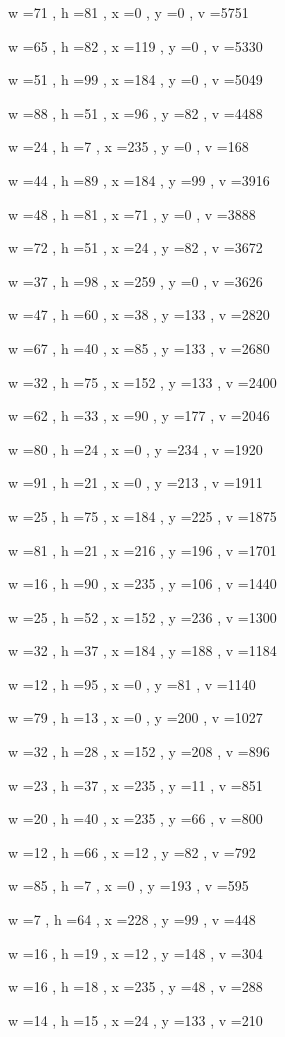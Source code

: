 \documentclass[11pt]{article}
\begin{document}
w =71 , h =81 , x =0 , y =0 , v =5751
\par
w =65 , h =82 , x =119 , y =0 , v =5330
\par
w =51 , h =99 , x =184 , y =0 , v =5049
\par
w =88 , h =51 , x =96 , y =82 , v =4488
\par
w =24 , h =7 , x =235 , y =0 , v =168
\par
w =44 , h =89 , x =184 , y =99 , v =3916
\par
w =48 , h =81 , x =71 , y =0 , v =3888
\par
w =72 , h =51 , x =24 , y =82 , v =3672
\par
w =37 , h =98 , x =259 , y =0 , v =3626
\par
w =47 , h =60 , x =38 , y =133 , v =2820
\par
w =67 , h =40 , x =85 , y =133 , v =2680
\par
w =32 , h =75 , x =152 , y =133 , v =2400
\par
w =62 , h =33 , x =90 , y =177 , v =2046
\par
w =80 , h =24 , x =0 , y =234 , v =1920
\par
w =91 , h =21 , x =0 , y =213 , v =1911
\par
w =25 , h =75 , x =184 , y =225 , v =1875
\par
w =81 , h =21 , x =216 , y =196 , v =1701
\par
w =16 , h =90 , x =235 , y =106 , v =1440
\par
w =25 , h =52 , x =152 , y =236 , v =1300
\par
w =32 , h =37 , x =184 , y =188 , v =1184
\par
w =12 , h =95 , x =0 , y =81 , v =1140
\par
w =79 , h =13 , x =0 , y =200 , v =1027
\par
w =32 , h =28 , x =152 , y =208 , v =896
\par
w =23 , h =37 , x =235 , y =11 , v =851
\par
w =20 , h =40 , x =235 , y =66 , v =800
\par
w =12 , h =66 , x =12 , y =82 , v =792
\par
w =85 , h =7 , x =0 , y =193 , v =595
\par
w =7 , h =64 , x =228 , y =99 , v =448
\par
w =16 , h =19 , x =12 , y =148 , v =304
\par
w =16 , h =18 , x =235 , y =48 , v =288
\par
w =14 , h =15 , x =24 , y =133 , v =210
\par
\end{document}

